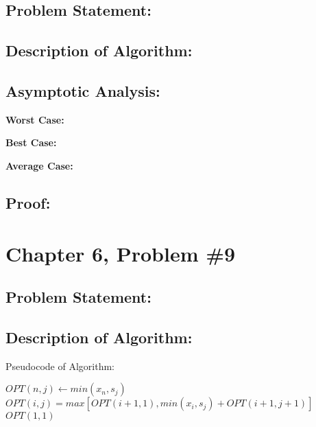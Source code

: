 \documentclass{article}
\begin{document}
\subsection*{Problem Statement:}  

\subsection*{Description of Algorithm:}

\subsection*{Asymptotic Analysis:}

\noindent \textbf{Worst Case:} \newline

\noindent \textbf{Best Case:} \newline

\noindent \textbf{Average Case:} \newline

\subsection*{Proof:}

\newpage

\section*{Chapter 6, Problem \#9 }

\subsection*{Problem Statement:}  

\subsection*{Description of Algorithm:}


\begin{algorithm}[h!]
\caption{Pseudocode of Algorithm:}
\begin{algorithmic}
	\State $OPT(n, j) \gets min(x_n, s_j)$
\EndFor
{}
		\State $OPT(i, j) = max[ OPT(i+1, 1), min(x_i, s_j) + OPT(i+1, j+1)]$
	\EndFor
\EndFor
\State \Return $OPT(1, 1)$
\end{algorithmic}
\end{algorithm}
\end{document}
